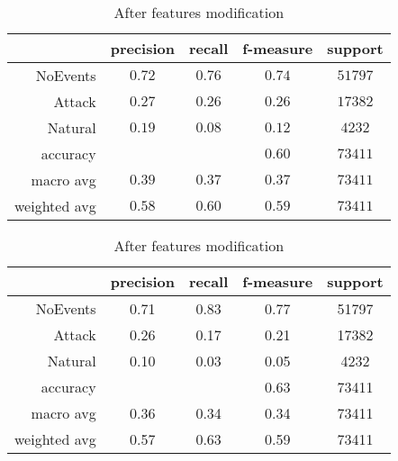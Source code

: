\begin{table}[H]
    \centering
    \footnotesize
    \caption{Features modification results for Decision Tree classifier} \label{tab:fm_dt}
    \begin{subtable}[t]{.5\linewidth}
        \centering
        \caption{Before features modification} 
        \begin{tabular}{rcccc}\toprule
            & precision    &recall & f-measure  & support \\\midrule
                NoEvents  &   $  0.72 $  &  $ 0.76 $  &  $ 0.74 $  & $ 51797 $\\
                  Attack   &  $  0.27 $   & $ 0.26 $  &  $ 0.26 $  & $ 17382 $\\
                 Natural   &  $  0.19 $   & $ 0.08 $  &  $ 0.12 $  & $  4232 $\\
                accuracy   &            &          &  $0.60$  &   $73411$ \\
               macro avg   &  $  0.39 $   & $ 0.37 $  &  $ 0.37 $  & $ 73411 $\\
            weighted avg   &  $  0.58 $  &  $ 0.60 $  &  $ 0.59 $ &  $ 73411 $\\\bottomrule
        \end{tabular}
    \end{subtable}%
    \begin{subtable}[t]{.5\linewidth}
        \centering
        \caption{After features modification}
        \begin{tabular}{rcccc}\toprule
            &precision   & recall & f-measure &  support  \\\midrule
    
            NoEvents   &    0.71   &   0.83  &    0.77   &  51797 \\
              Attack    &   0.26   &   0.17  &    0.21   &  17382 \\
             Natural   &    0.10   &   0.03   &   0.05  &    4232 \\
        
            accuracy    &          &          &   0.63   &  73411 \\
           macro avg    &   0.36   &   0.34   &   0.34   &  73411 \\
        weighted avg     &  0.57   &   0.63   &   0.59   &  73411    \\     \bottomrule   
        \end{tabular}
    \end{subtable}
\end{table}

